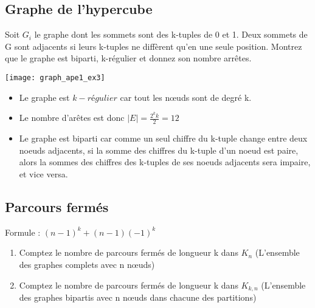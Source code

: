 \subsection{Graphe de l'hypercube}
Soit $G_{i}$ le graphe dont les sommets sont des k-tuples de 0 et 1. Deux sommets de G sont adjacents si leurs k-tuples ne diffèrent qu'en une seule position. Montrez que le graphe est biparti, k-régulier et donnez son nombre arrêtes.\\

\begin{solution}
\begin{minipage}{0.35\textwidth}
\begin{flushleft}
\texttt{[image: graph\_ape1\_ex3]}
\end{flushleft}
\end{minipage}
\begin{minipage}{0.65\textwidth}
\begin{flushright}
\begin{itemize}
\item Le graphe est $k-régulier$ car tout les nœuds sont de degré k.
\item Le nombre d'arêtes est donc $|E| = \frac{2^{k} k}{2} = 12$
\item Le graphe est biparti car comme un seul chiffre du k-tuple change entre deux noeuds adjacents, si la somme des chiffres du k-tuple d'un noeud est paire, alors la sommes des chiffres des k-tuples de ses noeuds adjacents sera impaire, et vice versa.
\end{itemize}
\end{flushright}
\end{minipage}
\end{solution}

\subsection{Parcours fermés}
Formule : $(n-1)^{k} + (n-1)(-1)^{k}$
\begin{enumerate}
\item{Comptez le nombre de parcours fermés de longueur k dans $K_{n}$ (L'ensemble des graphes complets avec n nœuds)}
\item{Comptez le nombre de parcours fermés de longueur k dans $K_{k,n}$ (L'ensemble des graphes bipartis avec n nœuds dans chacune des partitions)}
\end{enumerate}

